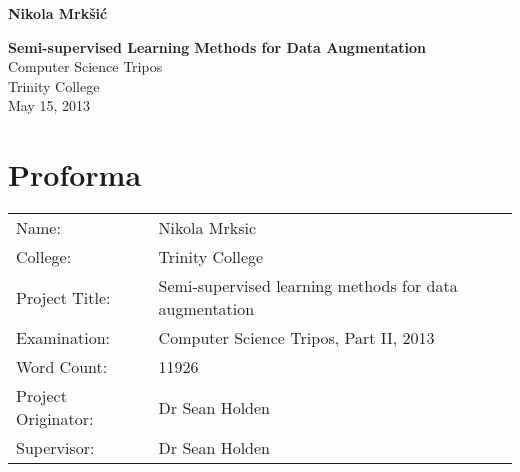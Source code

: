 \documentclass[12pt,twoside,notitlepage,amsart]{report} %
\begin{document}
	
	
	
	
	
	
	\pagestyle{empty}
	
	\hfill{\LARGE \bf Nikola Mrk\v{s}i\'c}
	
	\vspace*{60mm}
	\begin{center}
	\Huge
	{\bf Semi-supervised Learning Methods for Data Augmentation } \\
	\vspace*{5mm}
	Computer Science Tripos \\
	\vspace*{5mm}
	Trinity College \\
	\vspace*{5mm}
	May 15, 2013  %
	\end{center}
	
	\cleardoublepage
	
	
	\setcounter{page}{1}
	\pagestyle{plain}
	
	\chapter*{Proforma}
	\begin{tabular}{ll}
	Name:               & Nikola Mrksic                    \\
	College:            & Trinity College                    \\
	Project Title:      & Semi-supervised learning methods for data augmentation \\
	Examination:        & Computer Science Tripos, Part II, 2013        \\
	Word Count:         & 11926 %
	\\
	Project Originator: & Dr Sean Holden                    \\
	Supervisor:         & Dr Sean Holden                    \\ 
	\end{tabular}
	
	
\end{document}

